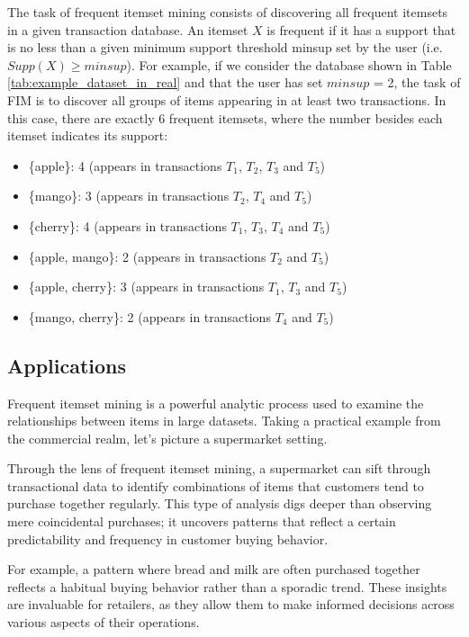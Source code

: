 The task of frequent itemset mining consists of discovering all frequent itemsets in a
given transaction database. An itemset $X$ is frequent if it has a support that is no less than
a given minimum support threshold minsup set by the user (i.e. $Supp(X) \geq minsup$). For
example, if we consider the database shown in Table \ref{tab:example_dataset_in_real} and that the user has set $minsup$ = 2,
the task of FIM is to discover all groups of items appearing in at least two transactions. In
this case, there are exactly 6 frequent itemsets, where the number besides each itemset indicates
its support:
\begin{itemize}
    \item \{apple\}: 4 (appears in transactions $T_1$, $T_2$, $T_3$ and $T_5$)
    \item \{mango\}: 3 (appears in transactions $T_2$, $T_4$ and $T_5$)
    \item \{cherry\}: 4 (appears in transactions $T_1$, $T_3$, $T_4$ and $T_5$)
    \item \{apple, mango\}: 2 (appears in transactions $T_2$ and $T_5$)
    \item \{apple, cherry\}: 3 (appears in transactions $T_1$, $T_3$ and $T_5$)
    \item \{mango, cherry\}: 2 (appears in transactions $T_4$ and $T_5$)
\end{itemize}

\subsection{Applications}
Frequent itemset mining is a powerful analytic process used to examine the relationships between items in large datasets. Taking a practical example from the commercial realm, let's picture a supermarket setting.

Through the lens of frequent itemset mining, a supermarket can sift through transactional data to identify combinations of items that customers tend to purchase together regularly. This type of analysis digs deeper than observing mere coincidental purchases; it uncovers patterns that reflect a certain predictability and frequency in customer buying behavior.

For example, a pattern where bread and milk are often purchased together reflects a habitual buying behavior rather than a sporadic trend. These insights are invaluable for retailers, as they allow them to make informed decisions across various aspects of their operations.

